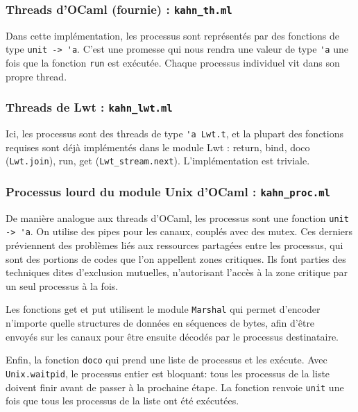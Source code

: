 \documentclass[]{scrartcl}
\begin{document}
\subsubsection{Threads d'OCaml (fournie) :
\lstinline!kahn_th.ml!}\label{threads-docaml-fournie-kahnux5fth.ml}

Dans cette implémentation, les processus sont représentés par des
fonctions de type \lstinline!unit -> 'a!. C'est une promesse qui nous
rendra une valeur de type \lstinline!'a! une fois que la fonction
\lstinline!run! est exécutée. Chaque processus individuel vit dans son
propre thread.

\subsubsection{Threads de Lwt :
\lstinline!kahn_lwt.ml!}\label{threads-de-lwt-kahnux5flwt.ml}

Ici, les processus sont des threads de type \lstinline!'a Lwt.t!, et la
plupart des fonctions requises sont déjà implémentés dans le module Lwt
: return, bind, doco (\lstinline!Lwt.join!), run, get
(\lstinline!Lwt_stream.next!). L'implémentation est triviale.

\subsubsection{Processus lourd du module Unix d'OCaml :
\lstinline!kahn_proc.ml!}\label{processus-lourd-du-module-unix-docaml-kahnux5fproc.ml}

De manière analogue aux threads d'OCaml, les processus sont une fonction
\lstinline!unit -> 'a!. On utilise des pipes pour les canaux, couplés
avec des mutex. Ces derniers préviennent des problèmes liés aux
ressources partagées entre les processus, qui sont des portions de codes
que l'on appellent zones critiques. Ils font parties des techniques
dites d'exclusion mutuelles, n'autorisant l'accès à la zone critique par
un seul processus à la fois.

Les fonctions get et put utilisent le module \lstinline!Marshal! qui
permet d'encoder n'importe quelle structures de données en séquences de
bytes, afin d'être\\envoyés sur les canaux pour être ensuite décodés par
le processus destinataire.

Enfin, la fonction \lstinline!doco! qui prend une liste de processus et
les exécute. Avec \lstinline!Unix.waitpid!, le processus entier est
bloquant: tous les processus de la liste doivent finir avant de passer à
la prochaine étape. La fonction renvoie \lstinline!unit! une fois que
tous les processus de la liste ont été exécutées.
\end{document}
